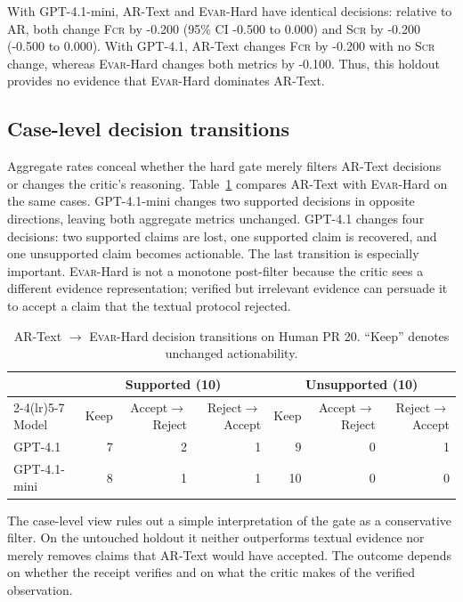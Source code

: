 \documentclass[acmsmall,screen,review,anonymous]{acmart}
\newcommand{\evar}{\textsc{Evar}\xspace}
\newcommand{\fcr}{\textsc{Fcr}\xspace}
\newcommand{\scr}{\textsc{Scr}\xspace}
\begin{document}
With GPT-4.1-mini, AR-Text and \evar-Hard have identical decisions: relative to AR, both change \fcr by -0.200 (95\% CI -0.500 to 0.000) and \scr by -0.200 (-0.500 to 0.000). With GPT-4.1, AR-Text changes \fcr by -0.200 with no \scr change, whereas \evar-Hard changes both metrics by -0.100. Thus, this holdout provides no evidence that \evar-Hard dominates AR-Text.

\subsection{Case-level decision transitions}

Aggregate rates conceal whether the hard gate merely filters AR-Text decisions or changes the critic's reasoning. Table~\ref{tab:transitions} compares AR-Text with \evar-Hard on the same cases. GPT-4.1-mini changes two supported decisions in opposite directions, leaving both aggregate metrics unchanged. GPT-4.1 changes four decisions: two supported claims are lost, one supported claim is recovered, and one unsupported claim becomes actionable. The last transition is especially important. \evar-Hard is not a monotone post-filter because the critic sees a different evidence representation; verified but irrelevant evidence can persuade it to accept a claim that the textual protocol rejected.

\begin{table}[h]
\centering
\caption{AR-Text $\rightarrow$ \evar-Hard decision transitions on Human PR 20. ``Keep'' denotes unchanged actionability.}
\label{tab:transitions}
\small
\begin{tabular}{@{}lrrrrrr@{}}
\toprule
& \multicolumn{3}{c}{Supported (10)} & \multicolumn{3}{c}{Unsupported (10)} \\
\cmidrule(lr){2-4}\cmidrule(lr){5-7}
Model & Keep & Accept$\to$Reject & Reject$\to$Accept & Keep & Accept$\to$Reject & Reject$\to$Accept \\
\midrule
GPT-4.1 & 7 & 2 & 1 & 9 & 0 & 1 \\
GPT-4.1-mini & 8 & 1 & 1 & 10 & 0 & 0 \\
\bottomrule
\end{tabular}
\end{table}

The case-level view rules out a simple interpretation of the gate as a conservative filter. On the untouched holdout it neither outperforms textual evidence nor merely removes claims that AR-Text would have accepted. The outcome depends on whether the receipt verifies and on what the critic makes of the verified observation.
\end{document}
